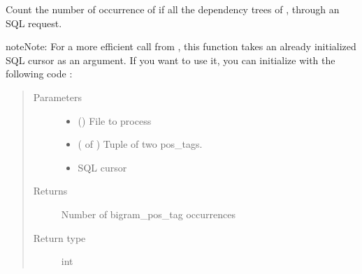 \documentclass[letterpaper,10pt,english]{sphinxmanual}
\begin{document}

\begin{fulllineitems}
\label{\detokenize{analysis:loacore.analysis.frequencies.count_bigram_pos_tag}}
Count the number of occurrence of  if all the dependency trees of , through an SQL request.

\begin{sphinxadmonition}{note}{Note:}
For a more efficient call from {\hyperref[\detokenize{analysis:loacore.analysis.frequencies.bigram_pos_tag_frequencies}]{}}, this function takes an already initialized SQL
cursor as an argument.
If you want to use it, you can initialize  with the following code :

%
\begin{sphinxVerbatim}[commandchars=\\\{\}]
   
   
  
  
\end{sphinxVerbatim}
\end{sphinxadmonition}
\begin{quote}\begin{description}
\item[{Parameters}] \leavevmode\begin{itemize}
\item {} 
 () \textendash{} File to process

\item {} 
 ( of ) \textendash{} Tuple of two pos\_tags.

\item {} 
 \textendash{} SQL cursor

\end{itemize}

\item[{Returns}] \leavevmode
Number of bigram\_pos\_tag occurrences

\item[{Return type}] \leavevmode
int

\end{description}\end{quote}

\end{fulllineitems}
\end{document}
